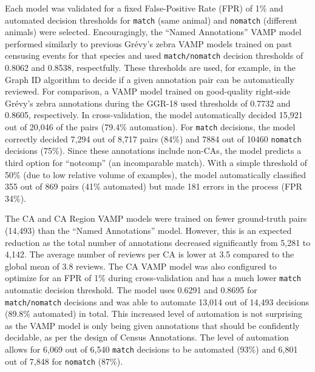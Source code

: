 Each model was validated for a fixed False-Positive Rate (FPR) of 1\% and automated decision thresholds for \texttt{match} (same animal) and \texttt{nomatch} (different animals) were selected.  Encouragingly, the ``Named Annotations'' VAMP model performed similarly to previous Gr\'evy's zebra VAMP models trained on past censusing events for that species and used \texttt{match/nomatch} decision thresholds of 0.8062 and 0.8538, respectfully.  These thresholds are used, for example, in the Graph ID algorithm to decide if a given annotation pair can be automatically reviewed.  For comparison, a VAMP model trained on good-quality right-side Gr\'evy's zebra annotations during the GGR-18 used thresholds of 0.7732 and 0.8605, respectively.  In cross-validation, the model automatically decided 15,921 out of 20,046 of the pairs (79.4\% automation).  For \texttt{match} decisions, the model correctly decided 7,294 out of 8,717 pairs (84\%) and 7884 out of 10460 \texttt{nomatch} decisions (75\%).  Since these annotations include non-CAs, the model predicts a third option for ``notcomp'' (an incomparable match).  With a simple threshold of 50\% (due to low relative volume of examples), the model automatically classified 355 out of 869 pairs (41\% automated) but made 181 errors in the process (FPR 34\%).

The CA and CA Region VAMP models were trained on fewer ground-truth pairs (14,493) than the ``Named Annotations'' model.  However, this is an expected reduction as the total number of annotations decreased significantly from 5,281 to 4,142. The average number of reviews per CA is lower at 3.5 compared to the global mean of 3.8 reviews.  The CA VAMP model was also configured to optimize for an FPR of 1\% during cross-validation and has a much lower \texttt{match} automatic decision threshold.  The model uses 0.6291 and 0.8695 for \texttt{match/nomatch} decisions and was able to automate 13,014 out of 14,493 decisions (89.8\% automated) in total.  This increased level of automation is not surprising as the VAMP model is only being given annotations that should be confidently decidable, as per the design of Census Annotations.  The level of automation allows for 6,069 out of 6,540 \texttt{match} decisions to be automated (93\%) and 6,801 out of 7,848 for \texttt{nomatch} (87\%).

